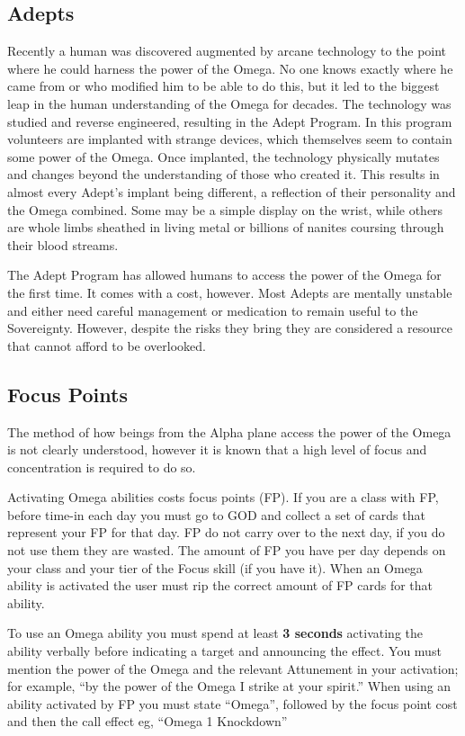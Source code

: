 \subsection{Adepts}

Recently a human was discovered augmented by arcane technology to the point where he could harness the power of the Omega. No one knows exactly where he came from or who modified him to be able to do this, but it led to the biggest leap in the human understanding of the Omega for decades. The technology was studied and reverse engineered, resulting in the Adept Program. In this program volunteers are implanted with strange devices, which themselves seem to contain some power of the Omega. Once implanted, the technology physically mutates and changes beyond the understanding of those who created it. This results in almost every Adept's implant being different, a reflection of their personality and the Omega combined. Some may be a simple display on the wrist, while others are whole limbs sheathed in living metal or billions of nanites coursing through their blood streams.

The Adept Program has allowed humans to access the power of the Omega for the first time. It comes with a cost, however. Most Adepts are mentally unstable and either need careful management or medication to remain useful to the Sovereignty. However, despite the risks they bring they are considered a resource that cannot afford to be overlooked.

\subsection{Focus Points}

The method of how beings from the Alpha plane access the power of the Omega is not clearly understood, however it is known that a high level of focus and concentration is required to do so.

Activating Omega abilities costs focus points (FP). If you are a class with FP, before time-in each day you must go to GOD and collect a set of cards that represent your FP for that day. FP do not carry over to the next day, if you do not use them they are wasted. The amount of FP you have per day depends on your class and your tier of the Focus skill (if you have it). When an Omega ability is activated the user must rip the correct amount of FP cards for that ability.

To use an Omega ability you must spend at least \textbf{3 seconds} activating the ability verbally before indicating a target and announcing the effect. You must mention the power of the Omega and the relevant Attunement in your activation; for example, ``by the power of the Omega I strike at your spirit.'' When using an ability activated by FP you must state ``Omega'', followed by the focus point cost and then the call effect eg, ``Omega 1 Knockdown''

